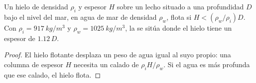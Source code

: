 \begin{proposition}[Flotación]\label{prop:b3:glaciology:flotation}
Un hielo de densidad $\rho_i$ y espesor $H$ sobre un lecho situado a una profundidad $D$ bajo el
nivel del mar, en agua de mar de densidad $\rho_w$, flota si $H < (\rho_w/\rho_i)D$.
Con $\rho_i = \qty{917}{kg/m^3}$ y $\rho_w = \qty{1025}{kg/m^3}$, la  se sitúa donde el
hielo tiene un espesor de $1.12\,D$.
\end{proposition}

\begin{proof}
El hielo flotante desplaza un peso de agua igual al suyo propio: una columna de espesor $H$
necesita un calado de $\rho_iH/\rho_w$. Si el agua es más profunda que ese calado,
el hielo flota.
\end{proof}

